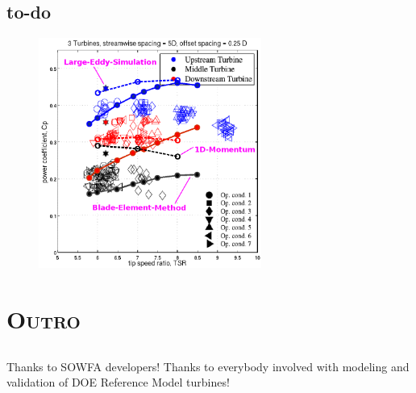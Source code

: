 \documentclass[xcolor=x11names,compress]{beamer}
\begin{document}
\subsection{to-do}
	
	\begin{frame}{}

		\begin{figure}[p]
		    \centering
		    \includegraphics[width=0.65\textwidth]{figures/FIG-2_3turbines-offset-5D-spacing-RANS_LES_EXP-annotation.png}
		\end{figure}

	\end{frame}


\section{\scshape Outro}

\subsection{}
	\begin{frame}{}
		Thanks to SOWFA developers! Thanks to everybody involved with 
		modeling and validation of DOE Reference Model turbines!

		\printbibliography[heading=none]

	\end{frame}
\end{document}
